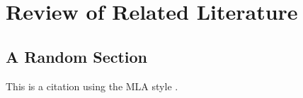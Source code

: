 \chapter{Review of Related Literature}

\section{A Random Section}

This is a citation using the MLA style \autocite{gioncu_earthquake_2011}.



